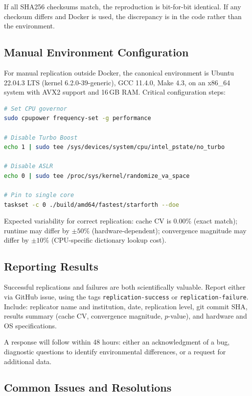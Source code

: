 If all SHA256 checksums match, the reproduction is bit-for-bit identical. If
any checksum differs and Docker is used, the discrepancy is in the code rather
than the environment.

\subsection{Manual Environment Configuration}

For manual replication outside Docker, the canonical environment is Ubuntu
22.04.3 LTS (kernel 6.2.0-39-generic), GCC 11.4.0, Make 4.3, on an x86\_64
system with AVX2 support and 16\,GB RAM. Critical configuration steps:

\begin{lstlisting}[language=bash]
# Set CPU governor
sudo cpupower frequency-set -g performance

# Disable Turbo Boost
echo 1 | sudo tee /sys/devices/system/cpu/intel_pstate/no_turbo

# Disable ASLR
echo 0 | sudo tee /proc/sys/kernel/randomize_va_space

# Pin to single core
taskset -c 0 ./build/amd64/fastest/starforth --doe
\end{lstlisting}

Expected variability for correct replication: cache CV is 0.00\% (exact
match); runtime may differ by $\pm 50\%$ (hardware-dependent); convergence
magnitude may differ by $\pm 10\%$ (CPU-specific dictionary lookup cost).

\subsection{Reporting Results}

Successful replications and failures are both scientifically valuable.
Report either via GitHub issue, using the tags \texttt{replication-success}
or \texttt{replication-failure}. Include: replicator name and institution,
date, replication level, git commit SHA, results summary (cache CV,
convergence magnitude, $p$-value), and hardware and OS specifications.

A response will follow within 48 hours: either an acknowledgment of a bug,
diagnostic questions to identify environmental differences, or a request for
additional data.

\subsection{Common Issues and Resolutions}

